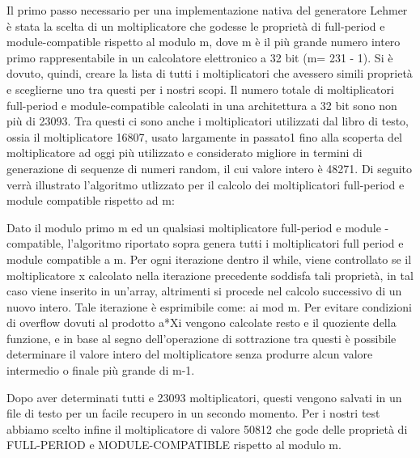 Il primo passo necessario per una implementazione nativa del generatore Lehmer è stata la scelta di un moltiplicatore che godesse le proprietà di full-period e module-compatible rispetto al modulo m, dove m è il più grande numero intero primo rappresentabile in un calcolatore elettronico a 32 bit (m= 231 - 1). Si è dovuto, quindi, creare la lista di tutti i moltiplicatori che avessero simili proprietà e sceglierne uno tra questi per i nostri scopi. Il numero totale di moltiplicatori full-period e module-compatible calcolati in una architettura a 32 bit sono non più di 23093. Tra questi ci sono anche i moltiplicatori utilizzati dal libro di testo, ossia il moltiplicatore 16807, usato largamente in passato1 fino alla scoperta del moltiplicatore ad oggi più utilizzato e considerato migliore in termini di generazione di sequenze di numeri random, il cui valore intero è 48271. Di seguito verrà illustrato l’algoritmo utlizzato per il calcolo dei moltiplicatori full-period e module compatible rispetto ad m:

Dato il modulo primo m ed un qualsiasi moltiplicatore full-period e module -compatible, l’algoritmo riportato sopra genera tutti i moltiplicatori full period e module compatible a m. Per ogni iterazione dentro il while, viene controllato se il moltiplicatore x calcolato nella iterazione precedente soddisfa tali proprietà, in tal caso viene inserito in un’array, altrimenti si procede nel calcolo successivo di un nuovo intero. Tale iterazione è esprimibile come: ai mod m.
Per evitare condizioni di overflow dovuti al prodotto a*Xi vengono calcolate resto e il quoziente della funzione, e in base al segno dell’operazione di sottrazione tra questi è possibile determinare il valore intero del moltiplicatore senza produrre alcun valore intermedio o finale più grande di m-1.

Dopo aver determinati tutti e 23093 moltiplicatori, questi vengono salvati in un file di testo per un facile recupero in un secondo momento. Per i nostri test abbiamo scelto infine il moltiplicatore di valore 50812 che gode delle proprietà di FULL-PERIOD e MODULE-COMPATIBLE rispetto al modulo m.

